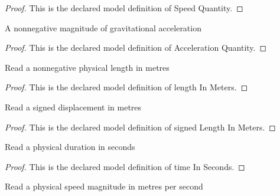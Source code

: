 \begin{proof}
  This is the declared model definition of Speed Quantity.
\end{proof}
\begin{definition}
  \label{def:physics:phyx-mini-0740:phyxminiproblems-problemphyxmini0740-accelerationquantity}
  A nonnegative magnitude of gravitational acceleration
\end{definition}
\begin{proof}
  This is the declared model definition of Acceleration Quantity.
\end{proof}
\begin{definition}
  \label{def:physics:phyx-mini-0740:phyxminiproblems-problemphyxmini0740-lengthinmeters}
  Read a nonnegative physical length in metres
\end{definition}
\begin{proof}
  This is the declared model definition of length In Meters.
\end{proof}
\begin{definition}
  \label{def:physics:phyx-mini-0740:phyxminiproblems-problemphyxmini0740-signedlengthinmeters}
  Read a signed displacement in metres
\end{definition}
\begin{proof}
  This is the declared model definition of signed Length In Meters.
\end{proof}
\begin{definition}
  \label{def:physics:phyx-mini-0740:phyxminiproblems-problemphyxmini0740-timeinseconds}
  Read a physical duration in seconds
\end{definition}
\begin{proof}
  This is the declared model definition of time In Seconds.
\end{proof}
\begin{definition}
  \label{def:physics:phyx-mini-0740:phyxminiproblems-problemphyxmini0740-speedinmeterspersecond}
  Read a physical speed magnitude in metres per second
\end{definition}
